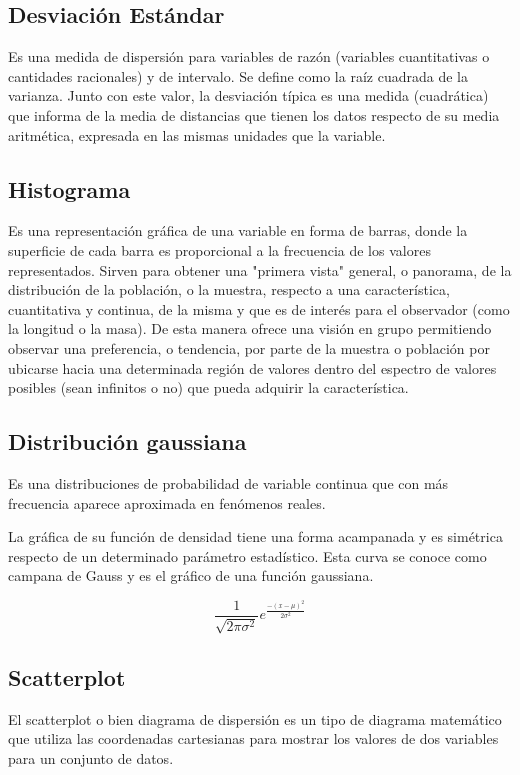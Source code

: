 \documentclass[a4paper,titlepage]{article}
\begin{document}
\subsection{Desviación Estándar}
Es una medida de dispersión para variables de razón (variables cuantitativas o 
cantidades racionales) y de intervalo. Se define como la raíz cuadrada de la 
varianza. Junto con este valor, la desviación típica es una medida (cuadrática) que 
informa de la media de distancias que tienen los datos respecto de su media 
aritmética, expresada en las mismas unidades que la variable.

\subsection{Histograma}
Es una representación gráfica de una variable en forma de barras, donde la 
superficie de cada barra es proporcional a la frecuencia de los valores representados. 
Sirven para obtener una "primera vista" general, o panorama, de la distribución de 
la población, o la muestra, respecto a una característica, cuantitativa y continua, de la 
misma y que es de interés para el observador (como la longitud o la masa). De esta 
manera ofrece una visión en grupo permitiendo observar una preferencia, o tendencia, por 
parte de la muestra o población por ubicarse hacia una determinada región de 
valores dentro del espectro de valores posibles (sean infinitos o no) que pueda 
adquirir la característica.


\subsection{Distribución gaussiana}
Es una distribuciones de probabilidad de variable continua que con más frecuencia 
aparece aproximada en fenómenos reales.

La gráfica de su función de densidad tiene una forma acampanada y es simétrica 
respecto de un determinado parámetro estadístico. Esta curva se conoce como campana 
de Gauss y es el gráfico de una función gaussiana.

$$\frac{1}{\sqrt{2\pi \sigma^2}}e^\frac{-(x-\mu)^2}{2 \sigma^2}$$

\subsection{Scatterplot}
El scatterplot o bien diagrama de dispersión es un tipo de diagrama matemático que utiliza 
las coordenadas cartesianas para mostrar los valores de dos variables para un 
conjunto de datos.
\end{document}
